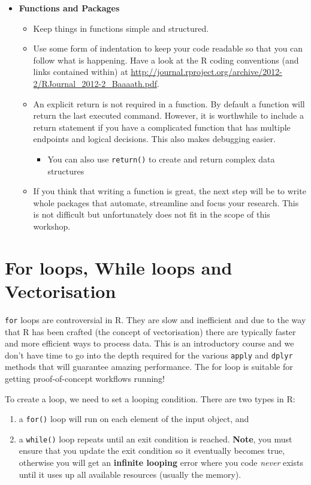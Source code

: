 \documentclass[a4paper]{book}
\providecommand{\tightlist}{%
  \setlength{\itemsep}{0pt}\setlength{\parskip}{0pt}}
\newenvironment{rmdblock}[1]
  {\vspace{1.5em}\begin{shaded*}
  \begin{itemize}
  \renewcommand{\labelitemi}{
    \raisebox{-.7\height}[0pt][0pt]{
      {\setkeys{Gin}{width=3em,keepaspectratio}\texttt{[image: images/\#1]}}
    }
  }
  \item
  }
  {
  \end{itemize}
  \end{shaded*}
  }
\newenvironment{rmdtip}
  {\begin{rmdblock}{tip}}
  {\end{rmdblock}}
\begin{document}
\begin{rmdtip}
\textbf{Functions and Packages}

\begin{itemize}
\item
  Keep things in functions simple and structured.
\item
  Use some form of indentation to keep your code readable so that you
  can follow what is happening. Have a look at the R coding conventions
  (and links contained within) at
  \url{http://journal.rproject.org/archive/2012-2/RJournal_2012-2_Baaaath.pdf}.
\item
  An explicit return is not required in a function. By default a
  function will return the last executed command. However, it is
  worthwhile to include a return statement if you have a complicated
  function that has multiple endpoints and logical decisions. This also
  makes debugging easier.

  \begin{itemize}
  \tightlist
  \item
    You can also use \texttt{return()} to create and return complex data
    structures
  \end{itemize}
\item
  If you think that writing a function is great, the next step will be
  to write whole packages that automate, streamline and focus your
  research. This is not difficult but unfortunately does not fit in the
  scope of this workshop.
\end{itemize}
\end{rmdtip}

\section{For loops, While loops and
Vectorisation}\label{for-loops-while-loops-and-vectorisation}

\texttt{for} loops are controversial in R. They are slow and inefficient
and due to the way that R has been crafted (the concept of
vectorisation) there are typically faster and more efficient ways to
process data. This is an introductory course and we don't have time to
go into the depth required for the various \texttt{apply} and
\texttt{dplyr} methods that will guarantee amazing performance. The for
loop is suitable for getting proof-of-concept workflows running!

To create a loop, we need to set a looping condition. There are two
types in R:

\begin{enumerate}
\def\labelenumi{\arabic{enumi}.}
\tightlist
\item
  a \texttt{for()} loop will run on each element of the input object,
  and
\item
  a \texttt{while()} loop repeats until an exit condition is reached.
  \textbf{Note}, you must ensure that you update the exit condition so
  it eventually becomes true, otherwise you will get an \textbf{infinite
  looping} error where you code \emph{never} exists until it uses up all
  available resources (usually the memory).
\end{enumerate}
\end{document}
